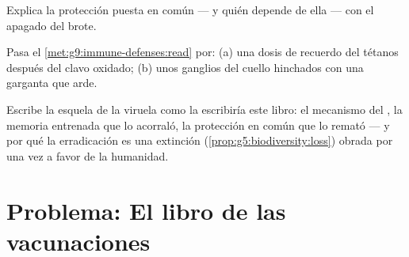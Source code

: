 \begin{exercise}[$\star\star$]\label{exo:g9:immune-defenses:10}
Explica la protección puesta en común --- y quién depende de ella ---
con el apagado del brote.
\end{exercise}

\begin{exercise}[$\star\star$]\label{exo:g9:immune-defenses:11}
Pasa el \cref{met:g9:immune-defenses:read} por: (a) una dosis de
recuerdo del tétanos después del clavo oxidado; (b) unos ganglios del
cuello hinchados con una garganta que arde.
\end{exercise}

\begin{exercise}[$\star\star\star$]\label{exo:g9:immune-defenses:12}
Escribe la esquela de la viruela como la escribiría este libro: el
mecanismo del , la memoria entrenada que lo acorraló, la
protección en común que lo remató --- y por qué la erradicación es una
extinción (\cref{prop:g5:biodiversity:loss}) obrada por una vez a favor
de la humanidad.
\end{exercise}

\section{Problema: El libro de las vacunaciones}

